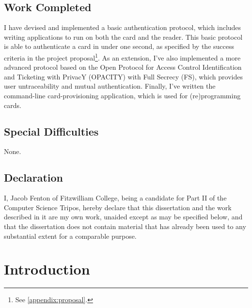 \documentclass[12pt,a4paper,twoside,openright]{report}
\begin{document}
\section*{Work Completed}

I have devised and implemented a basic authentication protocol, which includes writing applications to run on both the card and the reader. This basic protocol is able to authenticate a card in under one second, as specified by the success criteria in the project proposal\footnote{See \autoref{appendix:proposal}.}. As an extension, I've also implemented a more advanced protocol based on the Open Protocol for Access Control Identification and Ticketing with PrivacY (OPACITY) \cite{OPACITY} with Full Secrecy (FS), which provides user untraceability and mutual authentication. Finally, I've written the command-line card-provisioning application, which is used for (re)programming cards.

\section*{Special Difficulties}

None.
 
\newpage
\section*{Declaration}

I, Jacob Fenton of Fitzwilliam College, being a candidate for Part II of the Computer
Science Tripos, hereby declare that this dissertation and the work described in it are my own work,
unaided except as may be specified below, and that the dissertation
does not contain material that has already been used to any substantial
extent for a comparable purpose.

\bigskip
{}

\medskip
{}

\tableofcontents

\listoffigures

\listoflistings

\newpage


\pagestyle{headings}

\chapter{Introduction}
\end{document}
